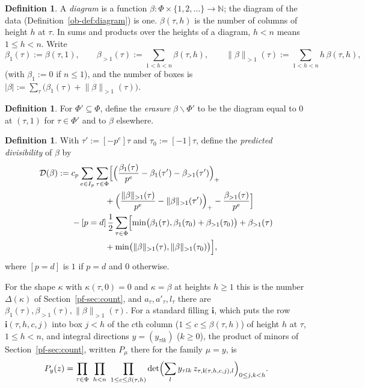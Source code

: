 \documentclass[reqno]{amsart}
\theoremstyle{plain}
\theoremstyle{definition}
\newtheorem{definition}[theorem]{Definition}
\theoremstyle{remark}
\newcommand{\N}{\mathbb{N}}
\newcommand{\Dc}{\mathcal{D}}
\newcommand{\bi}{\mathbf{i}}
\newcommand{\nb}[1]{\lVert #1 \rVert}
\begin{document}
\begin{definition}\label{def:diagram}
A \emph{diagram} is a function \(\beta\colon \Phi \times \{1, 2, \dots\} \to \N\); the diagram of the data (Definition~\ref{ob-def:diagram}) is one.  \(\beta(\tau, h)\) is the number of columns of height \(h\) at \(\tau\).  In sums and products over the heights of a diagram, \(h<n\) means \(1\le h<n\).  Write
\[
  \beta_1(\tau) := \beta(\tau, 1), \qquad
  \beta_{>1}(\tau) := \sum_{1 < h < n} \beta(\tau, h), \qquad
  \nb{\beta}_{>1}(\tau) := \sum_{1 < h < n} h\, \beta(\tau, h),
\]
(with \(\beta_1 := 0\) if \(n \le 1\)), and the number of boxes is \(\lvert\beta\rvert := \sum_\tau \bigl(\beta_1(\tau) + \nb{\beta}_{>1}(\tau)\bigr)\).
\end{definition}

\begin{definition}\label{def:erase}
For \(\Phi' \subseteq \Phi\), define the \emph{erasure} \(\beta \smallsetminus \Phi'\) to be the diagram equal to \(0\) at \((\tau, 1)\) for \(\tau \in \Phi'\) and to \(\beta\) elsewhere.
\end{definition}

\begin{definition}\label{def:predicted}
With \(\tau' := [-p^e]\tau\) and \(\tau_0 := [-1]\tau\), define the \emph{predicted divisibility} of \(\beta\) by
\[
\begin{aligned}
  \Dc(\beta) :={}& c_p \sum_{e \in I_p} \sum_{\tau \in \Phi} \Bigl[ \Bigl(\frac{\beta_1(\tau)}{p^e} - \beta_1(\tau') - \beta_{>1}(\tau')\Bigr)_+ \\
  &\qquad\qquad + \Bigl(\frac{\nb{\beta}_{>1}(\tau)}{p^e} - \nb{\beta}_{>1}(\tau')\Bigr)_+ - \frac{\beta_{>1}(\tau)}{p^e} \Bigr] \\
  &- [p = d]\, \frac12 \sum_{\tau \in \Phi} \Bigl[ \min\bigl(\beta_1(\tau), \beta_1(\tau_0) + \beta_{>1}(\tau_0)\bigr) + \beta_{>1}(\tau) \\
  &\qquad\qquad + \min\bigl(\nb{\beta}_{>1}(\tau), \nb{\beta}_{>1}(\tau_0)\bigr) \Bigr] ,
\end{aligned}
\]
where \([p = d]\) is \(1\) if \(p = d\) and \(0\) otherwise.
\end{definition}

For the shape \(\kappa\) with \(\kappa(\tau, 0) = 0\) and \(\kappa = \beta\) at heights \(h \ge 1\) this is the number \(\Delta(\kappa)\) of Section~\ref{pf-sec:count}, and \(a_\tau, a'_\tau, l_\tau\) there are \(\beta_1(\tau), \beta_{>1}(\tau), \nb{\beta}_{>1}(\tau)\).  For a standard filling \(\bi\), which puts the row \(\bi(\tau, h, c, j)\) into box \(j < h\) of the \(c\)th column (\(1 \le c \le \beta(\tau,h)\)) of height \(h\) at \(\tau\), \(1 \le h < n\), and integral directions \(y = (y_{\tau l k})\) (\(k \ge 0\)), the product of minors of Section~\ref{pf-sec:count}, written \(P_\mu\) there for the family \(\mu = y\), is
\[
  P_y(z) = \prod_{\tau \in \Phi}\ \prod_{h < n}\ \prod_{1 \le c \le \beta(\tau, h)} \det\Bigl( \sum_{l} y_{\tau l k}\, z_{\tau, \bi(\tau, h, c, j), l} \Bigr)_{0 \le j, k < h} .
\]
\end{document}
